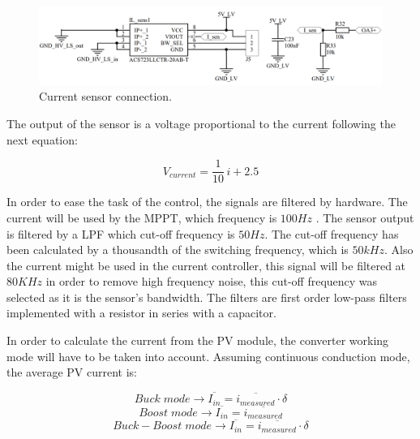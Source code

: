 \begin{figure}[htbp]
	\begin{center}
		\includegraphics[width=\textwidth]{../Pictures/P1/Sensors/current_sensor}
		\caption{Current sensor connection.}
		\label{current_sensor_application}
	\end{center}	
\end{figure}

The output of the sensor is a voltage proportional to the current following the next equation:

\begin{equation} 
V_{current} = \frac{1}{10} \, i + 2.5
\end{equation}

In order to ease the task of the control, the signals are filtered by hardware. The current will be used by the MPPT, which frequency is $100 Hz$ . The sensor output is filtered by a LPF which cut-off frequency is $50 Hz$. The cut-off frequency has been calculated by a thousandth of the switching frequency, which is $50 kHz$. Also the current might be used in the current controller, this signal will be filtered at $80 KHz$ in order to remove high frequency noise, this cut-off frequency was selected as it is the sensor's bandwidth. The filters are first order low-pass filters implemented with a resistor in series with a capacitor.

In order to calculate the current from the PV module, the converter working mode will have to be taken into account. Assuming continuous conduction mode, the average PV current is:


\begin{equation} 
	Buck \; mode \rightarrow \overline{I_{in}} = \overline{i_{measured}} \cdot \delta
\end{equation}
\begin{equation} 
Boost \; mode \rightarrow \overline{I_{in}} = \overline{i_{measured}}
\end{equation}
\begin{equation} 
Buck-Boost \; mode \rightarrow \overline{I_{in}} = \overline{i_{measured}} \cdot \delta
\end{equation}